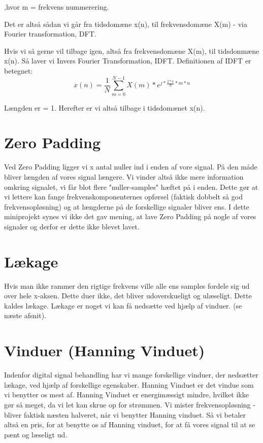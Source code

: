 \documentclass[12pt, letterpaper]{article}
\begin{document}
,hvor m = frekvens nummerering. 


Det er altså sådan vi går fra tidsdomæne x(n), til frekvensdomæne X(m) - via Fourier transformation, DFT. 

Hvis vi så gerne vil tilbage igen, altså fra frekvensdomæne X(m), til tidsdonmæne x(n). Så laver vi Invers Fourier Transformation, IDFT. 
Definitionen af IDFT er betegnet: 
$$x(n)= \frac{1}{N} \sum\limits_{m=0}^{N-1} X(m)*e^{j*\frac{2*\pi}{N}*m*n}$$

Længden er = 1. 
Herefter er vi altså tilbage i tidsdomænet x(n).

\section{Zero Padding}
Ved Zero Padding ligger vi x antal nuller ind i enden af vore signal. På den måde bliver længden af vores signal længere. Vi vinder altså ikke mere information omkring signalet, vi får blot flere "nuller-samples" hæftet på i enden. 
Dette gør at vi lettere kan fange frekvenskomponenternes opførsel (faktisk dobbelt så god frekvensopløsning) og at længderne på de forskellige signaler bliver ens. 
I dette miniprojekt synes vi ikke det gav mening, at lave Zero Padding på nogle af vores signaler og derfor er dette ikke blevet lavet. 

\section{Lækage}
Hvis man ikke rammer den rigtige frekvens ville alle ens samples fordele sig ud over hele x-aksen. Dette duer ikke, det bliver udoverskueligt og ulæseligt. Dette kaldes lækage. Lækage er noget vi kan få nedsætte ved hjælp af vinduer. (se næste afsnit). 

\section{Vinduer (Hanning Vinduet)}
Indenfor digital signal behandling har vi mange forskellige vinduer, der nedsætter lækage, ved hjælp af forskellige egenskaber. 
Hanning Vinduet er det vindue som vi benytter os mest af. 
Hanning Vinduet er energimæssigt mindre, hvilket ikke gør så meget, da vi let kan skrue op for strømmen. 
Vi mister frekvensopløsning - bliver faktisk næsten halveret, når vi benytter Hanning vinduet. Så vi betaler altså en pris, for at benytte os af Hanning vinduet, for at få vores signal til at se pænt og læseligt ud. 
\end{document}

